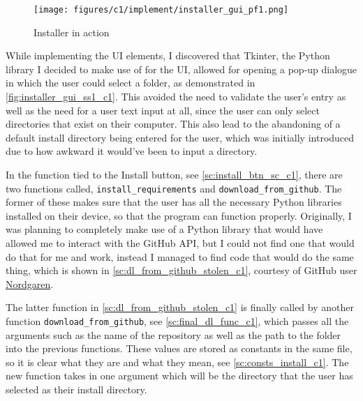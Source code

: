 \documentclass[11pt]{article}
\begin{document}
            \begin{figure}[!ht]
                \centering
                \texttt{[image: figures/c1/implement/installer\_gui\_pf1.png]}
                \caption{Installer in action}
                \label{fig:installer_gui_ss1_c1}
            \end{figure}


            While implementing the UI elements, I discovered that Tkinter, the Python library I decided to make use of for the UI, allowed for opening a pop-up dialogue in which the user could select a folder, as demonstrated in \autoref{fig:installer_gui_ss1_c1}.
            This avoided the need to validate the user's entry as well as the need for a user text input at all, since the user can only select directories that exist on their computer. 
            This also lead to the abandoning of a default install directory being entered for the user, which was initially introduced due to how awkward it would've been to input a directory.


            In the function tied to the Install button, see \autoref{sc:install_btn_sc_c1}, there are two functions called, \verb|install_requirements| and \verb|download_from_github|. 
            The former of these makes sure that the user has all the necessary Python libraries installed on their device, so that the program can function properly. 
            Originally, I was planning to completely make use of a Python library that would have allowed me to interact with the GitHub API, but I could not find one that would do that for me and work, instead I managed to find code that would do the same thing, which is shown in \autoref{sc:dl_from_github_stolen_c1}, courtesy of GitHub user \href{https://github.com/Nordgaren/Github-Folder-Downloader/tree/master}{Nordgaren}.


            The latter function in \autoref{sc:dl_from_github_stolen_c1} is finally called by another function \verb|download_from_github|, see \autoref{sc:final_dl_func_c1}, which passes all the arguments such as the name of the repository as well as the path to the folder into the previous functions. 
            These values are stored as constants in the same file, so it is clear what they are and what they mean, see \autoref{sc:consts_install_c1}. 
            The new function takes in one argument which will be the directory that the user has selected as their install directory. 
\end{document}
